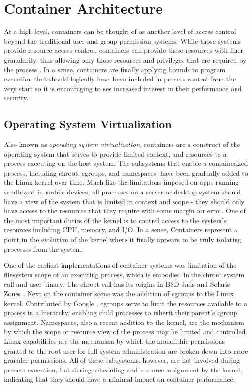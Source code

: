 \section{Container Architecture}
\label{sec:container_arch}
At a high level, containers can be thought of as another level of access control beyond the traditional user and group permission systems. 
While those systems provide resource access control, containers can provide these resources with finer granularity, thus allowing only those resources and privileges that are required by the process \autocite{_felter_1}. 
In a sense, containers are finally applying bounds to program execution that should logically have been included in process control from the very start so it is encouraging to see increased interest in their performance and security.

\subsection{Operating System Virtualization}
\label{sec:os_vt}
Also known as \emph{operating system virtualization}, containers are a construct of the operating system that serves to provide limited context, and resources to a process executing on the host system. 
The subsystems that enable a containerized process, including chroot, cgroups, and namespaces, have been gradually added to the Linux kernel over time.
Much like the limitations imposed on apps running sandboxed in mobile devices, all processes on a server or desktop system should have a view of the system that is limited in context and scope - they should only have access to the resources that they require with some margin for error.  
One of the most important duties of the kernel is to control access to the system's resources including CPU, memory, and I/O.  
In a sense, Containers represent a point in the evolution of the kernel where it finally appears to be truly isolating processes from the system. 

One of the earliest implementations of container systems was limitation of the filesystem scope of an executing process, which is embodied in the chroot system call and user-binary. 
The chroot call has its origins in BSD Jails and Solaris Zones \autocite{_zones_1}.
Next on the container scene was the addition of cgroups to the Linux kernel.  Contributed by Google \autocite{googlecgroups}, cgroups serve to limit the resources available to a process in a hierarchy, enabling child processes to inherit their parent's cgroup assignment. 
Namespaces, also a recent addition to the kernel, are the mechanism by which the scope or resource view of the process may be limited and controlled.
Linux capabilities are the mechanism by which the monolithic permissions granted to the root user for full system administration are broken down into more granular permissions.  
All of these subsystems, however, are not involved during process execution, but during scheduling and resource assignment by the kernel, indicating that they should have a minimal impact on container performance.  

